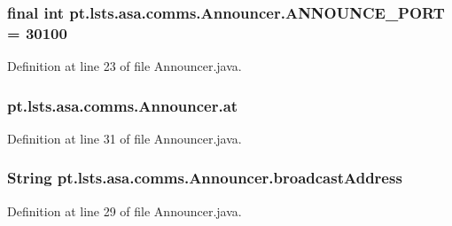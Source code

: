 \subsubsection[{A\+N\+N\+O\+U\+N\+C\+E\+\_\+\+P\+O\+R\+T}]{\setlength{\rightskip}{0pt plus 5cm}final int pt.\+lsts.\+asa.\+comms.\+Announcer.\+A\+N\+N\+O\+U\+N\+C\+E\+\_\+\+P\+O\+R\+T = 30100\hspace{0.3cm}{\ttfamily [static]}}\label{classpt_1_1lsts_1_1asa_1_1comms_1_1Announcer_a8f1d0dde03c935646275bb0ca3d247da}


Definition at line 23 of file Announcer.\+java.

\hypertarget{classpt_1_1lsts_1_1asa_1_1comms_1_1Announcer_ab58beeb4d4dcf2157e94042a7d27f8ac}{}
\subsubsection[{at}]{ pt.\+lsts.\+asa.\+comms.\+Announcer.\+at\hspace{0.3cm}{\ttfamily [private]}}\label{classpt_1_1lsts_1_1asa_1_1comms_1_1Announcer_ab58beeb4d4dcf2157e94042a7d27f8ac}


Definition at line 31 of file Announcer.\+java.

\hypertarget{classpt_1_1lsts_1_1asa_1_1comms_1_1Announcer_a849ac220046482feb3bbc0a3ce2e8767}{}
\subsubsection[{broadcast\+Address}]{\setlength{\rightskip}{0pt plus 5cm}String pt.\+lsts.\+asa.\+comms.\+Announcer.\+broadcast\+Address\hspace{0.3cm}{\ttfamily [private]}}\label{classpt_1_1lsts_1_1asa_1_1comms_1_1Announcer_a849ac220046482feb3bbc0a3ce2e8767}


Definition at line 29 of file Announcer.\+java.

\hypertarget{classpt_1_1lsts_1_1asa_1_1comms_1_1Announcer_a708b0e5d2f0d2e716f55597dbbc8f5d4}{}
